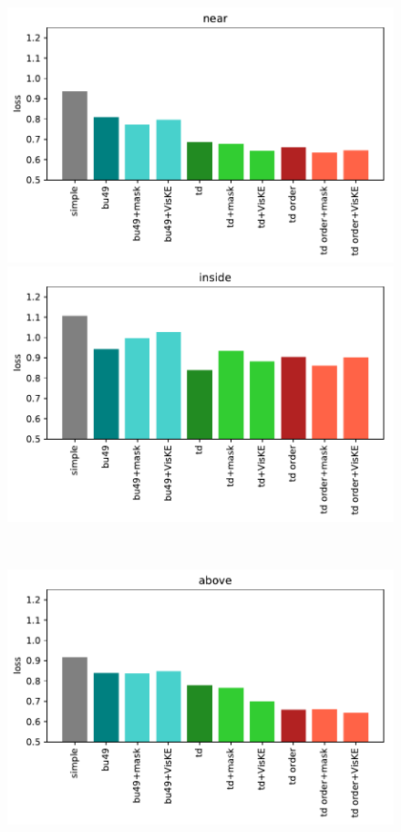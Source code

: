 \begin{figure}[ht!]
\begin{minipage}{0.5\columnwidth}
	\centering
	\includegraphics[width=\columnwidth]{studies/inlg2019/figures/results/loss/near.pdf}%
\end{minipage}%
\begin{minipage}{0.5\columnwidth}
	\centering
	\includegraphics[width=\columnwidth]{studies/inlg2019/figures/results/loss/inside.pdf}%
\end{minipage}\\
\begin{minipage}{0.5\columnwidth}
	\centering
	\includegraphics[width=\columnwidth]{studies/inlg2019/figures/results/loss/above.pdf}%

\end{minipage}
\end{figure}
